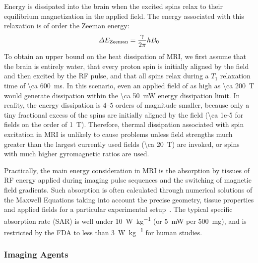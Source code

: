 Energy is dissipated into the brain when the excited spins relax to their equilibrium magnetization in the applied field.
The energy associated with this relaxation is of order the Zeeman energy:
\[\Delta E_{\text{\scriptsize Zeeman}} = \frac{\gamma}{2\pi} h B_0\]
To obtain an upper bound on the heat dissipation of MRI, we first assume that the brain is entirely water, that every proton spin is initially aligned by the field and then excited by the RF pulse, and that all spins relax during a $T_1$ relaxation time of \SI{\ca 600}{\ms}.
In this scenario, even an applied field of as high as \SI{\ca 200}{\tesla} would generate dissipation within the \SI{\ca 50}{\milli\watt} energy dissipation limit.
In reality, the energy dissipation is 4--5 orders of magnitude smaller, because only a tiny fractional excess of the spins are initially aligned by the field (\num{\ca 1e-5} for fields on the order of \SI{1}{\tesla}).
Therefore, thermal dissipation associated with spin excitation in MRI is unlikely to cause problems unless field strengths much greater than the largest currently used fields (\SI{\ca 20}{\tesla}) are invoked, or spins with much higher gyromagnetic ratios are used.

Practically, the main energy consideration in MRI is the absorption by tissues of RF energy applied during imaging pulse sequences and the switching of magnetic field gradients.
Such absorption is often calculated through numerical solutions of the Maxwell Equations taking into account the precise geometry, tissue properties and applied fields for a particular experimental setup~\cite{collins04}.
The typical specific absorption rate (SAR) is well under \SI{10}{\watt\per\kilogram} (or \SI{5}{\milli\watt} per \SI{500}{\milli\gram}), and is restricted by the FDA to less than \SI{3}{\watt\per\kilogram} for human studies.

\subsubsection{Imaging Agents}

